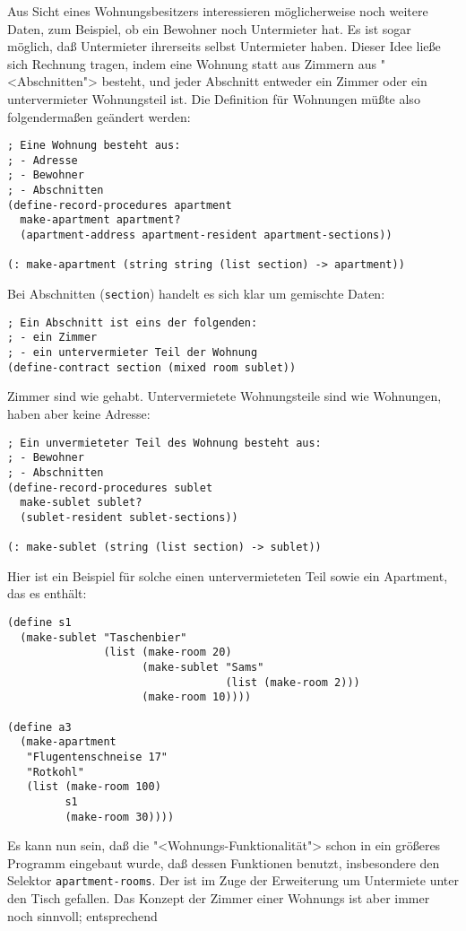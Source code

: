 Aus Sicht eines Wohnungsbesitzers interessieren möglicherweise noch
weitere Daten, zum Beispiel, ob ein Bewohner noch Untermieter hat.
Es ist sogar möglich, daß Untermieter ihrerseits selbst Untermieter
haben.  Dieser Idee ließe sich Rechnung tragen, indem eine Wohnung
statt aus Zimmern aus "<Abschnitten"> besteht, und jeder Abschnitt
entweder ein Zimmer oder ein untervermieter Wohnungsteil ist.  Die
Definition für Wohnungen müßte also folgendermaßen geändert werden:
%
\begin{verbatim}
; Eine Wohnung besteht aus:
; - Adresse
; - Bewohner
; - Abschnitten
(define-record-procedures apartment
  make-apartment apartment?
  (apartment-address apartment-resident apartment-sections))

(: make-apartment (string string (list section) -> apartment))
\end{verbatim}
%
Bei Abschnitten (\texttt{section}) handelt es sich klar um gemischte
Daten:
%
\begin{verbatim}
; Ein Abschnitt ist eins der folgenden:
; - ein Zimmer
; - ein untervermieter Teil der Wohnung
(define-contract section (mixed room sublet))
\end{verbatim}
%
Zimmer sind wie gehabt.   Untervermietete Wohnungsteile sind wie
Wohnungen, haben aber keine Adresse:
%
\begin{verbatim}
; Ein unvermieteter Teil des Wohnung besteht aus:
; - Bewohner
; - Abschnitten
(define-record-procedures sublet
  make-sublet sublet?
  (sublet-resident sublet-sections))

(: make-sublet (string (list section) -> sublet))
\end{verbatim}
%
Hier ist ein Beispiel für solche einen untervermieteten Teil sowie ein
Apartment, das es enthält:
%
\begin{verbatim}
(define s1
  (make-sublet "Taschenbier"
               (list (make-room 20) 
                     (make-sublet "Sams"
                                  (list (make-room 2)))
                     (make-room 10))))

(define a3
  (make-apartment
   "Flugentenschneise 17"
   "Rotkohl"
   (list (make-room 100)
         s1
         (make-room 30))))
\end{verbatim}
%
Es kann nun sein, daß die "<Wohnungs-Funktionalität"> schon in ein
größeres Programm eingebaut wurde, daß dessen Funktionen benutzt,
insbesondere den Selektor \texttt{apartment-rooms}.  Der ist im Zuge
der Erweiterung um Untermiete unter den Tisch gefallen.  Das Konzept
der Zimmer einer Wohnungs ist aber immer noch sinnvoll; entsprechend
